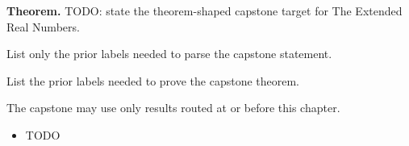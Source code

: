 \label{cap:extended-real-numbers}

\begin{tcolorbox}[
  colback=gray!6,
  colframe=gray!40,
  arc=2pt,
  left=8pt, right=8pt, top=6pt, bottom=6pt,
  title={\small\textbf{Capstone Theorem}},
  fonttitle=\small\bfseries
]
\textbf{Theorem.}
TODO: state the theorem-shaped capstone target for The Extended Real Numbers.
\end{tcolorbox}

\begin{remark*}
List only the prior labels needed to parse the capstone statement.
\end{remark*}

\begin{remark*}
List the prior labels needed to prove the capstone theorem.
\end{remark*}

\begin{remark*}
The capstone may use only results routed at or before this chapter.
\end{remark*}

\begin{dependencies}
\begin{itemize}
  \item TODO
\end{itemize}
\end{dependencies}

\clearpage
